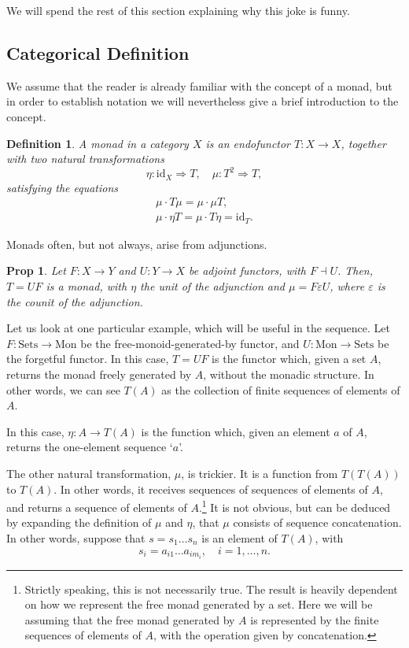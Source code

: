 \documentclass[11pt]{article}
\newtheorem{prop}{Prop}
\newtheorem{definition}{Definition}
\theoremstyle{nonumberplain}
\newcommand{\cat}[1]{\mathrm{#1}}
\newcommand{\id}{\mathrm{id}}
\newcommand{\nto}{\Rightarrow}
\begin{document}
We will spend the rest of this section explaining why this joke is funny.

\subsection{Categorical Definition}

We assume that the reader is already familiar with the concept of a monad, but in order to establish notation we will nevertheless give a brief introduction to the concept.

\begin{definition}
A monad in a category $X$ is an endofunctor $T \colon X \to X$, together with two natural transformations
\begin{equation}
\eta \colon \id_X \nto T, \quad \mu \colon T^2 \nto T,
\end{equation}
satisfying the equations
\begin{gather}
\mu \cdot T\mu = \mu \cdot \mu T,\\
\mu \cdot \eta T = \mu \cdot T \eta = \id_T.
\end{gather}
\end{definition}

Monads often, but not always, arise from adjunctions.

\begin{prop}
Let $F \colon X \to Y$ and $U \colon Y \to X$ be adjoint functors, with $F \dashv U$. Then, $T = UF$ is a monad, with $\eta$ the unit of the adjunction and $\mu = F \varepsilon U$, where $\varepsilon$ is the counit of the adjunction.
\end{prop}

Let us look at one particular example, which will be useful in the sequence. Let $F \colon \cat{Sets} \to \cat{Mon}$ be the free-monoid-generated-by functor, and $U \colon \cat{Mon} \to \cat{Sets}$ be the forgetful functor. In this case, $T = UF$ is the functor which, given a set $A$, returns the monad freely generated by $A$, without the monadic structure. In other words, we can see $T(A)$ as the collection of finite sequences of elements of $A$.

In this case, $\eta \colon A \to T(A)$ is the function which, given an element $a$ of $A$, returns the one-element sequence `$a$'.

The other natural transformation, $\mu$, is trickier. It is a function from $T(T(A))$ to $T(A)$. In other words, it receives sequences of sequences of elements of $A$, and returns a sequence of elements of $A$.\footnote{Strictly speaking, this is not necessarily true. The result is heavily dependent on how we represent the free monad generated by a set. Here we will be assuming that the free monad generated by $A$ is represented by the finite sequences of elements of $A$, with the operation given by concatenation.} It is not obvious, but can be deduced by expanding the definition of $\mu$ and $\eta$, that $\mu$ consists of sequence concatenation. In other words, suppose that $s = s_1 \dots s_n$ is an element of $T(A)$, with
\begin{equation}
s_i = a_{i1} \dots a_{i m_i}, \quad i = 1, \dots, n.
\end{equation}
\end{document}
